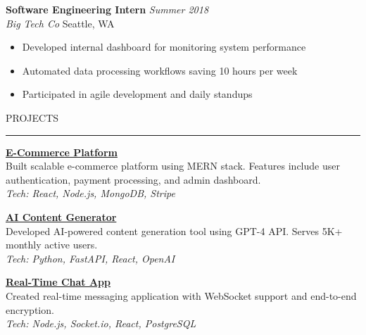 \documentclass[11pt,letterpaper]{article}
\newcommand{\resumesection}[1]{%
  \vspace{0.2cm}
  {\headerfont\large\color{headercolor} #1}
  \vspace{0.1cm}
  \hrule height 0.5pt
  \vspace{0.15cm}
}
\newcommand{\resumesubsection}[4]{%
  \textbf{#1} \hfill \textit{#2}\\
  \textit{#3} \hfill #4\\
  \vspace{0.1cm}
}
\begin{document}
\begin{multicols}{2}
\resumesubsection{Software Engineering Intern}{Summer 2018}{Big Tech Co}{Seattle, WA}
\begin{itemize}[leftmargin=*, nosep]
  \item Developed internal dashboard for monitoring system performance
  \item Automated data processing workflows saving 10 hours per week
  \item Participated in agile development and daily standups
\end{itemize}

\resumesection{PROJECTS}

\textbf{\href{https://project1.com}{E-Commerce Platform}}\\
Built scalable e-commerce platform using MERN stack. Features include user authentication, payment processing, and admin dashboard.\\
\textit{Tech: React, Node.js, MongoDB, Stripe}

\vspace{0.2cm}

\textbf{\href{https://project2.com}{AI Content Generator}}\\
Developed AI-powered content generation tool using GPT-4 API. Serves 5K+ monthly active users.\\
\textit{Tech: Python, FastAPI, React, OpenAI}

\vspace{0.2cm}

\textbf{\href{https://project3.com}{Real-Time Chat App}}\\
Created real-time messaging application with WebSocket support and end-to-end encryption.\\
\textit{Tech: Node.js, Socket.io, React, PostgreSQL}

\end{multicols}
\end{document}
